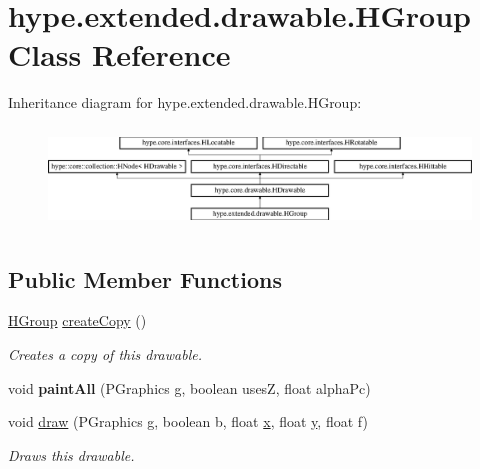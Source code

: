 \hypertarget{classhype_1_1extended_1_1drawable_1_1_h_group}{\section{hype.\-extended.\-drawable.\-H\-Group Class Reference}
\label{classhype_1_1extended_1_1drawable_1_1_h_group}
}
Inheritance diagram for hype.\-extended.\-drawable.\-H\-Group\-:\begin{figure}[H]
\begin{center}
\leavevmode
\includegraphics[height=2.745098cm]{classhype_1_1extended_1_1drawable_1_1_h_group}
\end{center}
\end{figure}
\subsection*{Public Member Functions}
\begin{DoxyCompactItemize}
\item 
\hyperlink{classhype_1_1extended_1_1drawable_1_1_h_group}{H\-Group} \hyperlink{classhype_1_1extended_1_1drawable_1_1_h_group_a39529ba2b7c9218e0d4dc1ab3aa6d8e4}{create\-Copy} ()
\begin{DoxyCompactList}\small\item\em Creates a copy of this drawable. \end{DoxyCompactList}\item 
\hypertarget{classhype_1_1extended_1_1drawable_1_1_h_group_a1a126a5752a33381c1e6cd1cb7a4d4e2}{void {\bfseries paint\-All} (P\-Graphics g, boolean uses\-Z, float alpha\-Pc)}\label{classhype_1_1extended_1_1drawable_1_1_h_group_a1a126a5752a33381c1e6cd1cb7a4d4e2}

\item 
void \hyperlink{classhype_1_1extended_1_1drawable_1_1_h_group_ae82ac3e36ac85034812148f8c821afcf}{draw} (P\-Graphics g, boolean b, float \hyperlink{classhype_1_1core_1_1drawable_1_1_h_drawable_aecdbc8b9aa2e41f7e19d2b12f3f0d36e}{x}, float \hyperlink{classhype_1_1core_1_1drawable_1_1_h_drawable_ac7bcfc7a213f2b55cf8d0a6cd647442a}{y}, float f)
\begin{DoxyCompactList}\small\item\em Draws this drawable. \end{DoxyCompactList}\end{DoxyCompactItemize}
